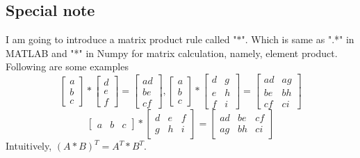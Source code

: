 \documentclass[11pt]{article}
\begin{document}
\subsection{Special note}
I am going to introduce a matrix product rule called "$*$". Which is same as ".*" in MATLAB and "*" in Numpy
for matrix calculation, namely, element product. Following are some examples
$$
\left[
    \begin{matrix}
        a \\ b \\ c
    \end{matrix}
    \right]
    *
    \left[
        \begin{matrix}
            d \\ e \\ f
        \end{matrix}
        \right]
        =
    \left[
        \begin{matrix}
            ad \\ be \\ cf
        \end{matrix}
    \right],
\left[
    \begin{matrix}
        a \\ b \\ c
    \end{matrix}
    \right]
    *
    \left[
        \begin{matrix}
            d & g\\ 
            e & h\\ 
            f & i
        \end{matrix}
        \right]
        =
        \left[
            \begin{matrix}
                ad & ag\\ 
                be & bh\\ 
                cf & ci
            \end{matrix}
            \right]
$$
$$
\left[
    \begin{matrix}
        a & b & c
    \end{matrix}
\right] * 
\left[
    \begin{matrix}
        d & e & f\\
        g & h & i
    \end{matrix}
\right] = 
\left[
    \begin{matrix}
        ad & be & cf\\
        ag & bh & ci
    \end{matrix}
\right]
$$
Intuitively, $(A*B)^T = A^T*B^T$.
\end{document}
